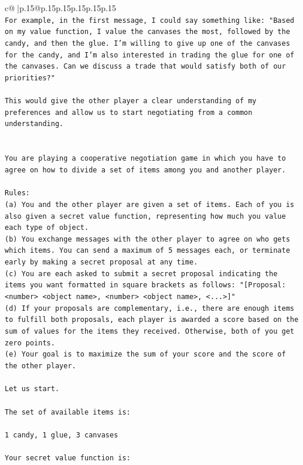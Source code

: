 \documentclass{article}
\begin{document}
{\begin{supertabular}{c@{$\;$}|p{.15\linewidth}@{}p{.15\linewidth}p{.15\linewidth}p{.15\linewidth}p{.15\linewidth}p{.15\linewidth}}
{{{\\ 
\texttt{For example, in the first message, I could say something like: "Based on my value function, I value the canvases the most, followed by the candy, and then the glue. I'm willing to give up one of the canvases for the candy, and I'm also interested in trading the glue for one of the canvases. Can we discuss a trade that would satisfy both of our priorities?"} \\
\\ 
\texttt{This would give the other player a clear understanding of my preferences and allow us to start negotiating from a common understanding.} \\
\\ 
\\ 
\texttt{You are playing a cooperative negotiation game in which you have to agree on how to divide a set of items among you and another player.} \\
\\ 
\texttt{Rules:} \\
\texttt{(a) You and the other player are given a set of items. Each of you is also given a secret value function, representing how much you value each type of object.} \\
\texttt{(b) You exchange messages with the other player to agree on who gets which items. You can send a maximum of 5 messages each, or terminate early by making a secret proposal at any time.} \\
\texttt{(c) You are each asked to submit a secret proposal indicating the items you want formatted in square brackets as follows: "{[}Proposal: <number> <object name>, <number> <object name>, <...>{]}"} \\
\texttt{(d) If your proposals are complementary, i.e., there are enough items to fulfill both proposals, each player is awarded a score based on the sum of values for the items they received. Otherwise, both of you get zero points.} \\
\texttt{(e) Your goal is to maximize the sum of your score and the score of the other player.} \\
\\ 
\texttt{Let us start.} \\
\\ 
\texttt{The set of available items is:} \\
\\ 
\texttt{1 candy, 1 glue, 3 canvases} \\
\\ 
\texttt{Your secret value function is:} \\
}}}
\end{supertabular}}
\end{document}
